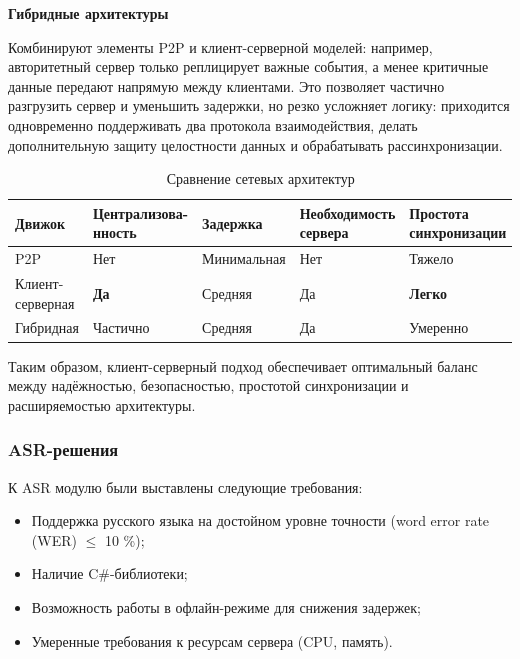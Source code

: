         \textbf{Гибридные архитектуры}

        Комбинируют элементы P2P и клиент-серверной моделей: например, авторитетный сервер только реплицирует важные события, а менее критичные данные передают напрямую между клиентами. Это позволяет частично разгрузить сервер и уменьшить задержки, но резко усложняет логику: приходится одновременно поддерживать два протокола взаимодействия, делать дополнительную защиту целостности данных и обрабатывать рассинхронизации.

        \begin{table}[ht]
            \caption{Сравнение сетевых архитектур}
            \centering
            \begingroup
            \fontsize{12}{14}\selectfont
            \renewcommand{\arraystretch}{1.2}
            \renewcommand{\tablename}{Табл.}
            \begin{tabularx}{\textwidth}{|X|X|X|X|X|}
            \hline
            \textbf{Движок}&\textbf{Централизова-нность} & \textbf{Задержка} & \textbf{Необходимость сервера}&\textbf{Простота синхронизации}\\
            \hline
            P2P&Нет&Минимальная&Нет&Тяжело\\
            \hline
            Клиент-серверная&\textbf{Да}&Средняя&Да&\textbf{Легко}\\
            \hline
            Гибридная&Частично&Средняя&Да&Умеренно\\
            \hline
            \end{tabularx}
            \endgroup
        \end{table}
        
        Таким образом, клиент-серверный подход обеспечивает оптимальный баланс между надёжностью, безопасностью, простотой синхронизации и расширяемостью архитектуры.

        \subsubsection{ASR-решения}

        К ASR модулю были выставлены следующие требования:
        \begin{itemize}
            \item Поддержка русского языка на достойном уровне точности (word error rate (WER) $\leq$ 10 \%);
            \item Наличие C\#-библиотеки;
            \item Возможность работы в офлайн-режиме для снижения задержек;
            \item Умеренные требования к ресурсам сервера (CPU, память).
        \end{itemize}

